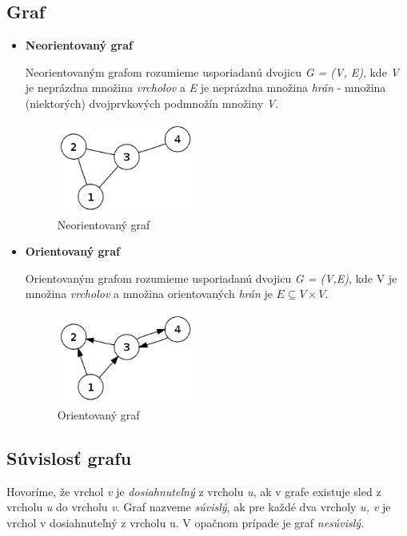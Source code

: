 \documentclass[slovak,master,public,dept460,male,cpdeclaration,oneside]{diploma}
\begin{document}
\subsection{Graf}
\begin{itemize}

\item \textbf{Neorientovaný graf}

Neorientovaným grafom rozumieme usporiadanú dvojicu \textit{G = (V, E)}, kde \textit{V} je neprázdna množina \textit{vrcholov} a \textit{E} je neprázdna množina \textit{hrán} - množina (niektorých) dvojprvkových podmnožín množiny \textit{V}.

\begin{figure}[H]
\centering
\includegraphics[width=4.5cm,height=3cm]{figures/neorientovany}
\caption{Neorientovaný graf}
\end{figure}

\item \textbf{Orientovaný graf}

Orientovaným grafom rozumieme usporiadanú dvojicu \textit{G = (V,E)}, kde V je množina \textit{vrcholov} a množina orientovaných \textit{hrán} je $E \subseteq  V \times V$. 

\begin{figure}[H]
\centering
\includegraphics[width=4.5cm,height=3cm]{figures/orientovany}
\caption{Orientovaný graf}
\end{figure}

\end{itemize}
\newpage
\subsection{Súvislosť grafu}

Hovoríme, že vrchol \textit{v} je \textit{dosiahnuteľný} z vrcholu \textit{u}, ak v grafe existuje sled z vrcholu \textit{u} do vrcholu \textit{v}. Graf nazveme \textit{súvislý}, ak pre každé dva vrcholy \textit{u, v} je vrchol v dosiahnuteľný z vrcholu u. V opačnom prípade je graf \textit{nesúvislý}.
\end{document}
